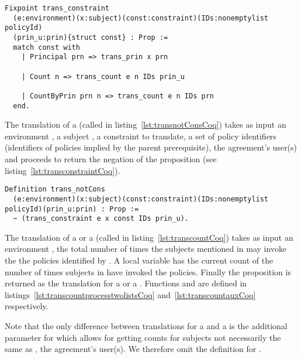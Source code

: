 \begin{minipage}[c]{0.95\textwidth}
\begin{lstlisting}
Fixpoint trans_constraint 
  (e:environment)(x:subject)(const:constraint)(IDs:nonemptylist policyId)
  (prin_u:prin){struct const} : Prop := 
  match const with
    | Principal prn => trans_prin x prn
  
    | Count n => trans_count e n IDs prin_u

    | CountByPrin prn n => trans_count e n IDs prn 
  end.  
\end{lstlisting}
\end{minipage}

The translation of a  (called  in listing~\ref{lst:transnotConsCoq}) takes as input 
an environment , a subject , a constraint  to translate, a set of policy identifiers  (identifiers of policies implied by the parent prerequisite), the agreement's user(s)  and proceeds to return the negation of the proposition  (see listing~\ref{lst:transconstraintCoq}).

\begin{lstlisting}
Definition trans_notCons
  (e:environment)(x:subject)(const:constraint)(IDs:nonemptylist policyId)(prin_u:prin) : Prop :=
  ~ (trans_constraint e x const IDs prin_u).
\end{lstlisting}


The translation of a  or a  (called  in listing~\ref{lst:transcountCoq}) takes as input an environment ,  the total number of times the subjects mentioned in  may invoke the 
the policies identified by .
A local variable  has the current count of the number of times subjects in  have invoked the policies. Finally the proposition  is returned as the translation for a  or a . Functions  and  are defined in listings~\ref{lst:transcountprocesstwolistsCoq} and~\ref{lst:transcountauxCoq} respectively.

Note that the only difference between translations for a  and a  is the additional  parameter for  which allows for getting counts for subjects not necessarily the same as , the agreement's user(s). We therefore omit the definition for .


